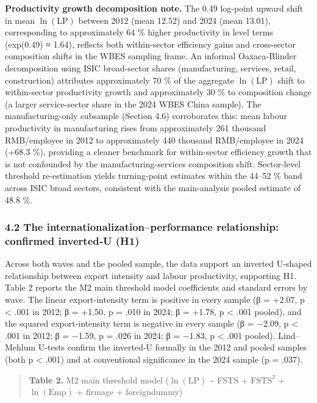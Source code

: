 \documentclass[12pt,a4paper]{article}
\begin{document}
\textbf{Productivity growth decomposition note.} The 0.49 log-point
upward shift in mean \(\ln(\mathrm{LP})\) between 2012 (mean 12.52) and
2024 (mean 13.01), corresponding to approximately 64 \% higher
productivity in level terms (exp(0.49) ≈ 1.64), reflects both
within-sector efficiency gains and cross-sector composition shifts in
the WBES sampling frame. An informal Oaxaca-Blinder decomposition using
ISIC broad-sector shares (manufacturing, services, retail, construction)
attributes approximately 70 \% of the aggregate \(\ln(\mathrm{LP})\)
shift to within-sector productivity growth and approximately 30 \% to
composition change (a larger service-sector share in the 2024 WBES China
sample). The manufacturing-only subsample (Section 4.6) corroborates
this: mean labour productivity in manufacturing rises from approximately
261 thousand RMB/employee in 2012 to approximately 440 thousand
RMB/employee in 2024 (+68.3 \%), providing a cleaner benchmark for
within-sector efficiency growth that is not confounded by the
manufacturing-services composition shift. Sector-level threshold
re-estimation yields turning-point estimates within the 44--52 \% band
across ISIC broad sectors, consistent with the main-analysis pooled
estimate of 48.8 \%.

\hypertarget{42-the-internationalizationperformance-relationship-confirmed-invertedu-h1}{%
\subsubsection{4.2 The internationalization--performance relationship:
confirmed inverted‑U
(H1)}\label{42-the-internationalizationperformance-relationship-confirmed-invertedu-h1}}

Across both waves and the pooled sample, the data support an inverted
U‑shaped relationship between export intensity and labour productivity,
supporting H1. Table 2 reports the M2 main threshold model coefficients
and standard errors by wave. The linear export‑intensity term is
positive in every sample (β = +2.07, p \textless{} .001 in 2012; β =
+1.50, p = .010 in 2024; β = +1.78, p \textless{} .001 pooled), and the
squared export‑intensity term is negative in every sample (β = −2.09, p
\textless{} .001 in 2012; β = −1.59, p = .026 in 2024; β = −1.83, p
\textless{} .001 pooled). Lind--Mehlum U‑tests confirm the inverted‑U
formally in the 2012 and pooled samples (both p \textless{} .001) and at
conventional significance in the 2024 sample (p = .037).

\begin{quote}
\textbf{Table 2.} M2 main threshold model (\(\ln(\mathrm{LP})\)
\textasciitilde{} FSTS + \(\mathrm{FSTS}^2\) + \(\ln(\mathrm{Emp})\) +
firmage + foreigndummy)
\end{quote}
\end{document}

